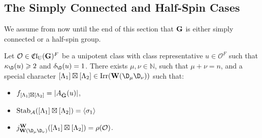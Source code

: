 \documentclass[eqthmnum]{jt-calcs}
\newcommand{\Clu}{\ensuremath{\mathfrak{Cl}_{\mathrm{U}}}}
\begin{document}
\subsection{The Simply Connected and Half-Spin Cases}
\begin{pa}
We assume from now until the end of this section that $\mathbf{G}$ is either simply connected or a half-spin group.
\end{pa}

\begin{prop}\label{prop:lusztig-typeD-1}
Let $\mathcal{O} \in \Clu(\bG)^F$ be a unipotent class with class representative $u \in \mathcal{O}^F$ such that $\kappa_{\D}(u) \geqslant 2$ and $\delta_{\D}(u) = 1$. There exists $\mu,\nu \in \mathbb{N}$, such that $\mu + \nu = n$, and a special character $[\Lambda_1] \boxtimes [\Lambda_2] \in \Irr(\bW(\D_{\mu}\D_{\nu}))$ such that:
\begin{itemize}
	\item $f_{[\Lambda_1]\boxtimes[\Lambda_2]} = |A_{\tilde{\mathbf{G}}}(u)|$,
	\item $\operatorname{Stab}_{\mathcal{A}}([\Lambda_1]\boxtimes [\Lambda_2]) = \langle \sigma_1 \rangle$
	\item $j_{\bW(\D_{\mu}\D_{\nu})}^{\bW}([\Lambda_1] \boxtimes [\Lambda_2]) = \rho(\mathcal{O})$.
\end{itemize}
\end{prop}
\end{document}
